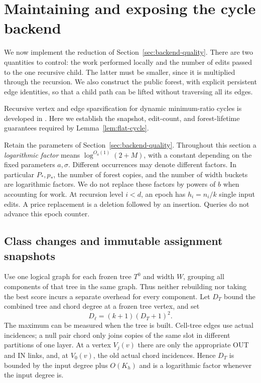 \section{Maintaining and exposing the cycle backend}
\label{sec:backend-updates}

We now implement the reduction of Section~\ref{sec:backend-quality}.
There are two quantities to control: the work performed locally and the
number of edits passed to the one recursive child.  The latter must be
smaller, since it is multiplied through the recursion.  We also construct
the public forest, with explicit persistent edge identities, so that a
child path can be lifted without traversing all its edges.

Recursive vertex and edge sparsification for dynamic minimum-ratio
cycles is developed in \cite[Sections~5 and~7]{IncrementalGraphs}.
Here we establish the snapshot, edit-count, and forest-lifetime
guarantees required by Lemma~\ref{lem:flat-cycle}.

Retain the parameters of Section~\ref{sec:backend-quality}.  Throughout
this section a \emph{logarithmic factor} means
$\log^{O_a(1)}(2+M)$, with a constant depending on the fixed parameters
$a,\sigma$.  Different occurrences may denote different factors.  In
particular $P_*,p_*$, the number of forest copies, and the number of width
buckets are logarithmic factors.  We do not replace these factors by
powers of $b$ when accounting for work.  At recursion level $i<d$, an
epoch has $h_i=n_i/k$ single input edits.  A price replacement is a
deletion followed by an insertion.  Queries do not advance this epoch
counter.

\subsection{Class changes and immutable assignment snapshots}

Use one logical graph for each frozen tree $T^0$ and width $W$, grouping
all components of that tree in the same graph.  Thus neither rebuilding
nor taking the best score incurs a separate overhead for every component.
Let $D_T$ bound the combined tree and chord degree at a frozen tree
vertex, and set
\begin{equation}
 D_\ell=(k+1)(D_T+1)^2.
 \label{update:logical-degree}
\end{equation}
The maximum can be measured when the tree is built.  Cell-tree edges use
actual incidences; a null pair chord only joins copies of the same slot
in different partitions of one layer.  At a vertex $V_j(v)$ there are
only the appropriate OUT and IN links, and, at $V_0(v)$, the old actual
chord incidences.  Hence $D_T$ is bounded by the input degree plus
$O(K_h)$ and is a logarithmic factor whenever the input degree is.

